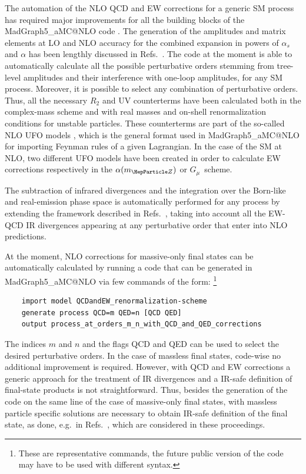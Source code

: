 \documentclass[11pt]{cernrep}
\begin{document}
The automation of the NLO QCD and EW corrections for a generic SM
process has required major improvements for all the building blocks of
the {\sc\small MadGraph5\_\-aMC@NLO} code
\cite{Frederix:2009yq,Hirschi:2011pa}.  The generation of the
amplitudes and matrix elements at LO and NLO accuracy for the combined
expansion in powers of $\alpha_s$ and $\alpha$ has been lengthly
discussed in Refs.~\cite{Alwall:2014hca, Frixione:2014qaa}. The code
at the moment is able to automatically calculate all the possible
perturbative orders stemming from tree-level amplitudes and their
interference with one-loop amplitudes, for any SM process.
Moreover, it is possible to select any combination of perturbative
orders. Thus, all the necessary $R_2$ and UV counterterms have been
calculated both in the complex-mass scheme and with real masses
and on-shell renormalization conditions for unstable particles. These
counterterms are part of the so-called NLO UFO models
\cite{Degrande:2011ua}, which is the general format used in {\sc\small
  MadGraph5\_\-aMC@NLO} for importing Feynman rules of a given
Lagrangian. In the case of the SM at NLO, two different UFO models
have been created in order to calculate EW corrections
respectively in the $\alpha(m_{\PZ})$ or $G_{\mu}$~scheme.

The subtraction of infrared divergences and the integration over the
Born-like and real-emission phase space is automatically performed for
any process by extending the framework described in
Refs.~\cite{Alwall:2014hca,Frederix:2009yq}, taking into account all
the EW-QCD IR divergences appearing at any perturbative order that
enter into NLO predictions.

At the moment, NLO corrections for massive-only final states can be
automatically calculated by running a code that can be generated in
{\sc\small MadGraph5\_\-aMC@NLO} via few commands of the form:%
\footnote{These are representative commands, the future public version
  of the code may have to be used with different syntax.}
\begin{verbatim}
    import model QCDandEW_renormalization-scheme
    generate process QCD=m QED=n [QCD QED]
    output process_at_orders_m_n_with_QCD_and_QED_corrections
\end{verbatim}
The indices $m$ and $n$ and the flags QCD and QED can be used to
select the desired perturbative orders.  In the case of massless final
states, code-wise no additional improvement is required. However, with
QCD and EW corrections a generic approach for the treatment of IR
divergences and a IR-safe definition of final-state products is not
straightforward. Thus, besides the generation of the code on the same
line of the case of massive-only final states, with massless particle
specific solutions are necessary to obtain IR-safe definition of the
final state, as done, e.g.\ in
Refs.~\cite{Kallweit:2014xda,Denner:2014ina}, which are considered in
these proceedings.
\end{document}
